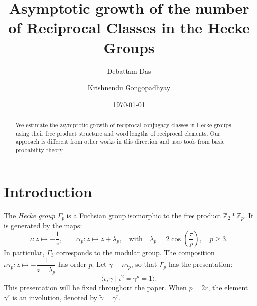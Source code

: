 \documentclass[11pt]{amsart}
\date{\today}
\numberwithin{equation}{section}
\numberwithin{equation}{section}
\begin{document}
	\title[Asymptotic growth of the number of Reciprocal Classes in the Hecke Groups]{ Asymptotic growth of the number of Reciprocal Classes in the Hecke Groups }
	\author{Debattam Das  \and Krishnendu Gongopadhyay}
    
	\address{Indian Institute of Science Education and Research (IISER) Mohali,
		Knowledge City,  Sector 81, S.A.S. Nagar 140306, Punjab, India}
    \address{Indian Institute of Science Education and Research (IISER) Mohali,
		Knowledge City,  Sector 81, S.A.S. Nagar 140306, Punjab, India}
	
	
	\begin{abstract}
    We estimate the asymptotic growth of reciprocal conjugacy classes in Hecke groups using their free product structure and word lengths of reciprocal elements. Our approach is different from other works in this direction and uses tools from basic probability theory.
	\end{abstract}
	
	\maketitle	
	
	\section{Introduction}\label{1}
	
    
The \emph{Hecke group} \( \Gamma_p \) is a Fuchsian group isomorphic to the free product \( \mathbb{Z}_2 * \mathbb{Z}_p \). It is generated by the maps:
\[
\iota: z \mapsto -\dfrac{1}{z}, \qquad \alpha_p: z \mapsto z + \lambda_p, \quad \text{with} \quad \lambda_p = 2 \cos\left(\frac{\pi}{p}\right), \quad p \geq 3.
\]
In particular, \( \Gamma_3 \) corresponds to the modular group. The composition \( \iota \alpha_p : z \mapsto -\dfrac{1}{z + \lambda_p} \) has order \( p \). Let \( \gamma = \iota \alpha_p \), so that \( \Gamma_p \) has the presentation:
\[
\langle \iota, \gamma \mid \iota^2 = \gamma^p = 1 \rangle.
\]
This presentation will be fixed throughout the paper. When \( p = 2r \), the element \( \gamma^r \) is an involution, denoted by \( \tilde{\gamma} = \gamma^r \).
\end{document}
